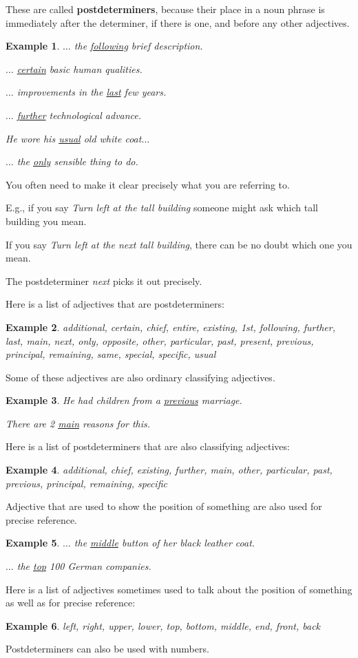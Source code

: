 \documentclass[oneside]{book}
\numberwithin{equation}{section}
\newtheorem{example}{Example}[section]
\begin{document}
These are called \textbf{postdeterminers}, because their place in a noun phrase is immediately after the determiner, if there is one, and before any other adjectives.
\begin{example}
    $\ldots$ the \underline{following} brief description.
    
    $\ldots$ \underline{certain} basic human qualities.
    
    $\ldots$ improvements in the \underline{last} few years.
    
    $\ldots$ \underline{further} technological advance.
    
    He wore his \underline{usual} old white coat$\ldots$
    
    $\ldots$ the \underline{only} sensible thing to do.
\end{example}
You often need to make it clear precisely what you are referring to.

E.g., if you say \textit{Turn left at the tall building} someone might ask which tall building you mean.

If you say \textit{Turn left at the next tall building}, there can be no doubt which one you mean.

The postdeterminer \textit{next} picks it out precisely.

%
Here is a list of adjectives that are postdeterminers:
\begin{example}
    additional, certain, chief, entire, existing, 1st, following, further, last, main, next, only, opposite, other, particular, past, present, previous, principal, remaining, same, special, specific, usual
\end{example}
Some of these adjectives are also ordinary classifying adjectives.
\begin{example}
    He had children from a \underline{previous} marriage.
    
    There are 2 \underline{main} reasons for this.
\end{example}
Here is a list of postdeterminers that are also classifying adjectives:
\begin{example}
    additional, chief, existing, further, main, other, particular, past, previous, principal, remaining, specific
\end{example}
Adjective that are used to show the position of something are also used for precise reference.
\begin{example}
    $\ldots$ the \underline{middle} button of her black leather coat.
    
    $\ldots$ the \underline{top} 100 German companies.
\end{example}
Here is a list of adjectives sometimes used to talk about the position of something as well as for precise reference:
\begin{example}
    left, right, upper, lower, top, bottom, middle, end, front, back
\end{example}
Postdeterminers can also be used with numbers.
\end{document}
